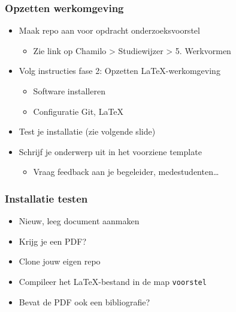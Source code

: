 \documentclass[aspectratio=169]{beamer}
\begin{document}
\begin{frame}
  \frametitle{Opzetten werkomgeving}

  \begin{itemize}
    \item Maak repo aan voor opdracht onderzoeksvoorstel
      \begin{itemize}
        \item Zie link op Chamilo > Studiewijzer > 5. Werkvormen
      \end{itemize}
    \item Volg instructies fase 2: Opzetten \LaTeX-werkomgeving
      \begin{itemize}
        \item Software installeren
        \item Configuratie Git, LaTeX
      \end{itemize}
    \item Test je installatie (zie volgende slide)
    \item Schrijf je onderwerp uit in het voorziene template
      \begin{itemize}
        \item Vraag feedback aan je begeleider, medestudenten\ldots
      \end{itemize}
  \end{itemize}
\end{frame}

\begin{frame}
  \frametitle{Installatie testen}

  \begin{itemize}
    \item Nieuw, leeg document aanmaken
    \item Krijg je een PDF?
    \item Clone jouw eigen repo
    \item Compileer het {\LaTeX}-bestand in de map \texttt{voorstel}
    \item Bevat de PDF ook een bibliografie?
  \end{itemize}
\end{frame}
\end{document}
